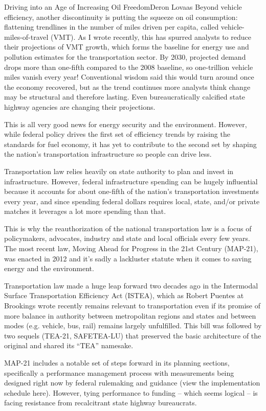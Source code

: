 \documentclass{papertex}
\begin{document}
\begin{news}{2}{Driving into an Age of Increasing Oil Freedom}{Deron Lovaas}{}{}
Beyond vehicle efficiency, another discontinuity is putting the squeeze on oil 
consumption: flattening trendlines in the number of miles driven per capita, 
called vehicle-miles-of-travel (VMT). As I wrote recently, this has spurred 
analysts to reduce their projections of VMT growth, which forms the baseline 
for energy use and pollution estimates for the transportation sector. By 2030, 
projected demand drops more than one-fifth compared to the 2008 baseline, so 
one-trillion vehicle miles vanish every year! Conventional wisdom said this 
would turn around once the economy recovered, but as the trend continues more 
analysts think change may be structural and therefore lasting. Even 
bureaucratically calcified state highway agencies are changing their 
projections.

This is all very good news for energy security and the environment. However, 
while federal policy drives the first set of efficiency trends by raising the 
standards for fuel economy, it has yet to contribute to the second set by 
shaping the nation’s transportation infrastructure so people can drive less.

Transportation law relies heavily on state authority to plan and invest in 
infrastructure. However, federal infrastructure spending can be hugely 
influential because it accounts for about one-fifth of the nation’s 
transportation investments every year, and since spending federal dollars 
requires local, state, and/or private matches it leverages a lot more spending 
than that.

This is why the reauthorization of the national transportation law is a focus 
of policymakers, advocates, industry and state and local officials every few 
years. The most recent law, Moving Ahead for Progress in the 21st Century 
(MAP-21), was enacted in 2012 and it’s sadly a lackluster statute when it 
comes to saving energy and the environment.

Transportation law made a huge leap forward two decades ago in the Intermodal 
Surface Transportation Efficiency Act (ISTEA), which as Robert Puentes at 
Brookings wrote recently remains relevant to transportation even if its 
promise of more balance in authority between metropolitan regions and states 
and between modes (e.g. vehicle, bus, rail) remains largely unfulfilled. This 
bill was followed by two sequels (TEA-21, SAFETEA-LU) that preserved the basic 
architecture of the original and shared its “TEA” namesake.

MAP-21 includes a notable set of steps forward in its planning sections, 
specifically a performance management process with measurements being designed 
right now by federal rulemaking and guidance (view the implementation schedule 
here). However, tying performance to funding – which seems logical – is facing 
resistance from recalcitrant state highway bureaucrats.


\end{news}
\end{document}
